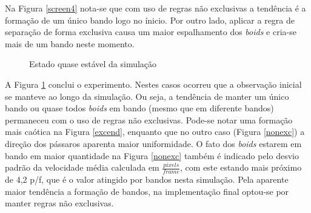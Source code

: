 \documentclass[12pt]{article}
\begin{document}
Na Figura \ref{screen4} nota-se que com uso de regras não exclusivas a
tendência é a formação de um único bando logo no ínicio. Por outro
lado, aplicar a regra de separação de forma exclusiva causa um maior
espalhamento dos \textit{boids} e cria-se mais de um bando neste momento.

\begin{figure}[h!]
  \centering
  \caption{Estado quase estável da simulação \label{screen5}}
\end{figure}

A Figura \ref{screen5} conclui o experimento. Nestes casos
ocorreu que a observação inicial se manteve ao longo da
simulação. Ou seja, a tendência de manter um único bando ou quase todos
\textit{boids} em bando (mesmo que em diferente bandos) permaneceu com
o uso de regras não exclusivas. Pode-se notar uma formação mais caótica
na Figura \ref{excend}, enquanto que no outro caso (Figura
\ref{nonexc}) a direção dos
pássaros aparenta maior uniformidade. O fato
dos \textit{boids} estarem em bando em maior quantidade na
Figura \ref{nonexc} também é indicado pelo desvio padrão da velocidade
média calculada em $\frac{pixels}{frame}$, com este estando mais
próximo de 4,2 p/f, que é o valor atingido por bandos nesta simulação.
Pela aparente maior tendência a formação de bandos, na implementação
final optou-se por manter regras não exclusivas.
\end{document}
